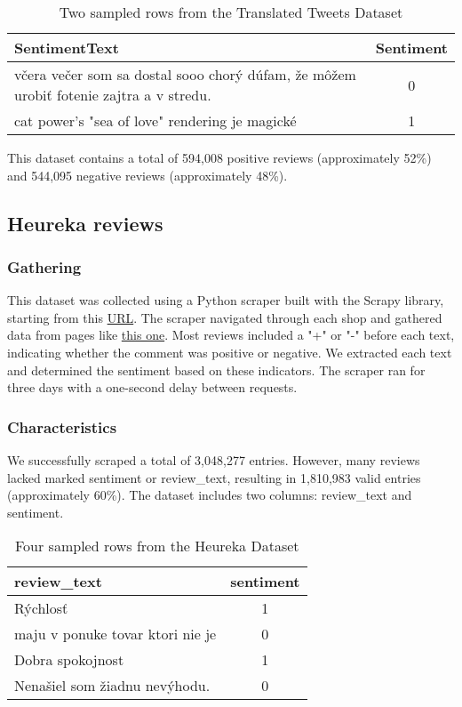 \documentclass[11pt]{article}
\begin{document}
\begin{table}[h!]
    \centering
    \begin{tabular}{|p{5cm}|c|} %
        \hline
        \textbf{SentimentText} & \textbf{Sentiment} \\
        \hline
        \raggedright včera večer som sa dostal sooo chorý dúfam, že môžem urobiť fotenie zajtra a v stredu. & 0 \\
        \hline
        \raggedright cat power's "sea of love" rendering je magické & 1 \\
        \hline
    \end{tabular}
    \caption{Two sampled rows from the Translated Tweets Dataset}
    \label{tab:translated tweets}
\end{table}

This dataset contains a total of 594,008 positive reviews (approximately 52\%) and 544,095 negative reviews (approximately 48\%).


\subsection{Heureka reviews}
\subsubsection{Gathering}
This dataset was collected using a Python scraper built with the Scrapy library, starting from this \href{https://obchody.heureka.sk/}{URL}. The scraper navigated through each shop and gathered data from pages like \href{https://obchody.heureka.sk/datart-sk/recenze/overene}{this one}. Most reviews included a "+" or "-" before each text, indicating whether the comment was positive or negative. We extracted each text and determined the sentiment based on these indicators. The scraper ran for three days with a one-second delay between requests.
\subsubsection{Characteristics}
We successfully scraped a total of 3,048,277 entries. However, many reviews lacked marked sentiment or review\_text, resulting in 1,810,983 valid entries (approximately 60\%). The dataset includes two columns: review\_text and sentiment.

\begin{table}[h!]
    \centering
    \begin{tabular}{|p{5cm}|c|} %
        \hline
        \textbf{review\_text} & \textbf{sentiment} \\
        \hline
        \raggedright Rýchlosť & 1 \\
        \hline
        \raggedright  maju v ponuke tovar ktori nie je & 0 \\
        \hline
        \raggedright Dobra spokojnost & 1 \\
        \hline
        \raggedright Nenašiel som žiadnu nevýhodu. & 0 \\
        \hline
    \end{tabular}
    \caption{Four sampled rows from the Heureka Dataset}
    \label{tab:translated tweets}
\end{table}
\end{document}
